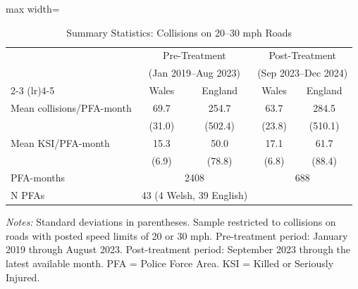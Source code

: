 \begin{table}[htbp]
\centering
\caption{Summary Statistics: Collisions on 20--30 mph Roads}
\label{tab:summary}
\begin{adjustbox}{max width=\textwidth}
\begin{tabular}{lcccc}
\hline\hline
 & \multicolumn{2}{c}{Pre-Treatment} & \multicolumn{2}{c}{Post-Treatment} \\
 & \multicolumn{2}{c}{(Jan 2019--Aug 2023)} & \multicolumn{2}{c}{(Sep 2023--Dec 2024)} \\
\cmidrule(lr){2-3} \cmidrule(lr){4-5}
 & Wales & England & Wales & England \\
\hline
Mean collisions/PFA-month & 69.7 & 254.7 & 63.7 & 284.5 \\
 & (31.0) & (502.4) & (23.8) & (510.1) \\
Mean KSI/PFA-month & 15.3 & 50.0 & 17.1 & 61.7 \\
 & (6.9) & (78.8) & (6.8) & (88.4) \\
PFA-months & \multicolumn{2}{c}{2408} & \multicolumn{2}{c}{688} \\
N PFAs & \multicolumn{2}{c}{43 (4 Welsh, 39 English)} & \multicolumn{2}{c}{} \\
\hline\hline
\end{tabular}
\end{adjustbox}
\smallskip
\begin{minipage}{\textwidth}
\footnotesize
\textit{Notes:} Standard deviations in parentheses. Sample restricted to collisions on roads with posted speed limits of 20 or 30 mph. Pre-treatment period: January 2019 through August 2023. Post-treatment period: September 2023 through the latest available month. PFA = Police Force Area. KSI = Killed or Seriously Injured.
\end{minipage}
\end{table}
